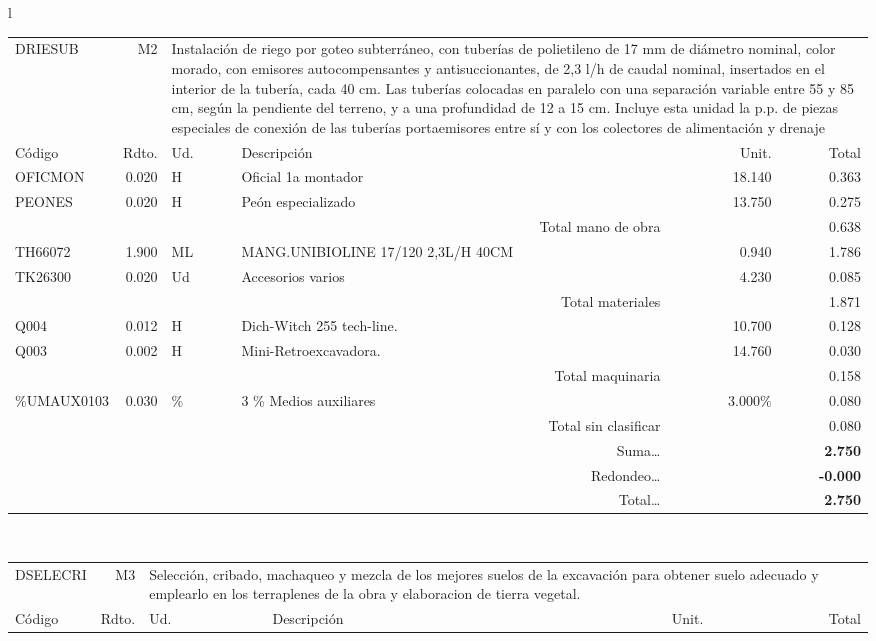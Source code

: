 \documentclass{book}%
\begin{document}
\begin{longtable}{l}
\begin{tabular}{l r l p{4cm} r r}%
DRIESUB&M2&\multicolumn{4}{p{7cm}}{Instalación de riego por goteo subterráneo, con tuberías de polietileno de 17 mm de diámetro nominal, color morado, con emisores autocompensantes y antisuccionantes, de 2,3 l/h de caudal nominal, insertados en el interior de la tubería, cada 40 cm. Las tuberías colocadas en paralelo con una separación variable entre 55 y 85 cm, según  la  pendiente del terreno, y a una profundidad de 12 a 15 cm. Incluye esta unidad la p.p. de piezas especiales de conexión de las tuberías portaemisores entre sí y con los colectores de alimentación  y drenaje}\\%
Código&Rdto.&Ud.&Descripción&Unit.&Total\\%
\hline%
OFICMON&0.020&H&Oficial 1a montador&18.140&0.363\\%
PEONES&0.020&H&Peón especializado&13.750&0.275\\%
\multicolumn{4}{r}{Total mano de obra}&&0.638\\%
TH66072&1.900&ML&MANG.UNIBIOLINE 17/120 2,3L/H 40CM&0.940&1.786\\%
TK26300&0.020&Ud&Accesorios varios&4.230&0.085\\%
\multicolumn{4}{r}{Total materiales}&&1.871\\%
Q004&0.012&H&Dich{-}Witch 255 tech{-}line.&10.700&0.128\\%
Q003&0.002&H&Mini{-}Retroexcavadora.&14.760&0.030\\%
\multicolumn{4}{r}{Total maquinaria}&&0.158\\%
\%UMAUX0103&0.030&\%&3 \% Medios auxiliares&3.000\%&0.080\\%
\multicolumn{4}{r}{Total sin clasificar}&&0.080\\%
\multicolumn{4}{r}{Suma\ldots}&\multicolumn{2}{r}{\textbf{2.750}}\\%
\multicolumn{4}{r}{Redondeo\ldots}&\multicolumn{2}{r}{\textbf{{-}0.000}}\\%
\multicolumn{4}{r}{Total\ldots}&\multicolumn{2}{r}{\textbf{2.750}}\\%
\end{tabular}\\%
\begin{tabular}{l r l p{4cm} r r}%
DSELECRI&M3&\multicolumn{4}{p{7cm}}{Selección, cribado, machaqueo y mezcla de los mejores suelos de la excavación para obtener suelo adecuado y emplearlo en los terraplenes de la obra y elaboracion de tierra vegetal.}\\%
Código&Rdto.&Ud.&Descripción&Unit.&Total\\%

\end{tabular}
\end{longtable}
\end{document}
